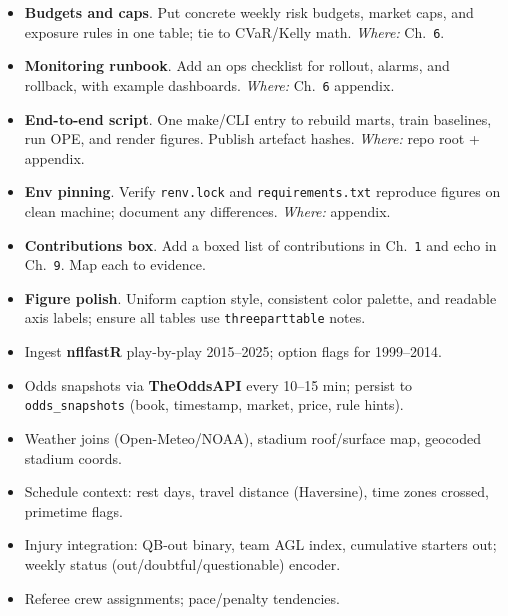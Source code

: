\begin{itemize}
  \item {} \textbf{Budgets and caps}. Put concrete weekly risk budgets, market caps, and exposure rules in one table; tie to CVaR/Kelly math. \emph{Where:} Ch.~\texttt{6}.
  \item {} \textbf{Monitoring runbook}. Add an ops checklist for rollout, alarms, and rollback, with example dashboards. \emph{Where:} Ch.~\texttt{6} appendix.
\end{itemize}

\begin{itemize}
  \item {} \textbf{End-to-end script}. One make/CLI entry to rebuild marts, train baselines, run OPE, and render figures. Publish artefact hashes. \emph{Where:} repo root + appendix.
  \item {} \textbf{Env pinning}. Verify \texttt{renv.lock} and \texttt{requirements.txt} reproduce figures on clean machine; document any differences. \emph{Where:} appendix.
\end{itemize}

\begin{itemize}
  \item {} \textbf{Contributions box}. Add a boxed list of contributions in Ch.~\texttt{1} and echo in Ch.~\texttt{9}. Map each to evidence.
  \item {} \textbf{Figure polish}. Uniform caption style, consistent color palette, and readable axis labels; ensure all tables use \texttt{threeparttable} notes.
\end{itemize}

\begin{itemize}
  \item {} Ingest \textbf{nflfastR} play-by-play 2015–2025; option flags for 1999–2014.
  \item {} Odds snapshots via \textbf{TheOddsAPI} every 10–15 min; persist to \texttt{odds\_snapshots} (book, timestamp, market, price, rule hints).
  \item {} Weather joins (Open-Meteo/NOAA), stadium roof/surface map, geocoded stadium coords.
  \item {} Schedule context: rest days, travel distance (Haversine), time zones crossed, primetime flags.
  \item {} Injury integration: QB-out binary, team AGL index, cumulative starters out; weekly status (out/doubtful/questionable) encoder.
  \item {} Referee crew assignments; pace/penalty tendencies.
\end{itemize}

